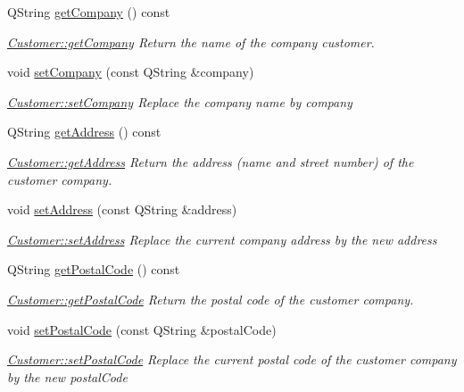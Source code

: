 \begin{DoxyCompactItemize}
Q\-String \hyperlink{classModels_1_1Customer_a23fb516872c6aebf9b1eb6a7ec86cb7f}{get\-Company} () const 
\begin{DoxyCompactList}\small\item\em \hyperlink{classModels_1_1Customer_a23fb516872c6aebf9b1eb6a7ec86cb7f}{Customer\-::get\-Company} Return the name of the company customer. \end{DoxyCompactList}\item 
void \hyperlink{classModels_1_1Customer_ab4faf3a76242bc4c3ac44bafd628a4c6}{set\-Company} (const Q\-String \&company)
\begin{DoxyCompactList}\small\item\em \hyperlink{classModels_1_1Customer_ab4faf3a76242bc4c3ac44bafd628a4c6}{Customer\-::set\-Company} Replace the company name by {\itshape company} \end{DoxyCompactList}\item 
Q\-String \hyperlink{classModels_1_1Customer_a594e1458ca9f3a449f2628c861bc3a40}{get\-Address} () const 
\begin{DoxyCompactList}\small\item\em \hyperlink{classModels_1_1Customer_a594e1458ca9f3a449f2628c861bc3a40}{Customer\-::get\-Address} Return the address (name and street number) of the customer company. \end{DoxyCompactList}\item 
void \hyperlink{classModels_1_1Customer_ae2d41b145d9c468f7e3c40a38882873d}{set\-Address} (const Q\-String \&address)
\begin{DoxyCompactList}\small\item\em \hyperlink{classModels_1_1Customer_ae2d41b145d9c468f7e3c40a38882873d}{Customer\-::set\-Address} Replace the current company address by the new {\itshape address} \end{DoxyCompactList}\item 
Q\-String \hyperlink{classModels_1_1Customer_ad544bdcd4d021f92bd77e5aa24f31f21}{get\-Postal\-Code} () const 
\begin{DoxyCompactList}\small\item\em \hyperlink{classModels_1_1Customer_ad544bdcd4d021f92bd77e5aa24f31f21}{Customer\-::get\-Postal\-Code} Return the postal code of the customer company. \end{DoxyCompactList}\item 
void \hyperlink{classModels_1_1Customer_a2bd4ac52294de78236e159caaa29412b}{set\-Postal\-Code} (const Q\-String \&postal\-Code)
\begin{DoxyCompactList}\small\item\em \hyperlink{classModels_1_1Customer_a2bd4ac52294de78236e159caaa29412b}{Customer\-::set\-Postal\-Code} Replace the current postal code of the customer company by the new {\itshape postal\-Code} \end{DoxyCompactList}\item 

\end{DoxyCompactItemize}
